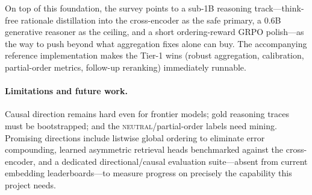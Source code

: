 On top of this foundation, the survey points to a sub-1B reasoning track---think-free
rationale distillation into the cross-encoder as the safe primary, a 0.6B generative
reasoner as the ceiling, and a short ordering-reward GRPO polish---as the way to push
beyond what aggregation fixes alone can buy. The accompanying reference implementation
makes the Tier-1 wins (robust aggregation, calibration, partial-order metrics, follow-up
reranking) immediately runnable.

\paragraph{Limitations and future work.} Causal direction remains hard even for frontier
models; gold reasoning traces must be bootstrapped; and the \textsc{neutral}/partial-order
labels need mining. Promising directions include listwise global ordering to eliminate
error compounding, learned asymmetric retrieval heads benchmarked against the cross-encoder,
and a dedicated directional/causal evaluation suite---absent from current embedding
leaderboards---to measure progress on precisely the capability this project needs.
